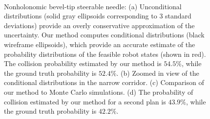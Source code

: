 \begin{figure}[!t]
{\,} \hfill
\hfill
{}
\hfill
\hfill
{}
{\,} \hfill
\vspace*{-5pt}
\caption{Nonholonomic bevel-tip steerable needle: (a) Unconditional distributions (solid gray ellipsoids corresponding to $3$ standard deviations) provide an overly conservative approximation of the uncertainty. Our method computes conditional distributions (black wireframe ellipsoids), which provide an accurate estimate of the probability distributions of the feasible robot states (shown in red). The collision probability estimated by our method is $54.5\%$, while the ground truth probability is $52.4\%$. (b) Zoomed in view of the conditional distributions in the narrow corridor. (c) Comparison of our method to Monte Carlo simulations. (d) The probability of collision estimated by our method for a second plan is $43.9\%$, while the ground truth probability is $42.2\%$.}
\vspace*{-15pt}
\label{fig:needle3d}
\end{figure}

